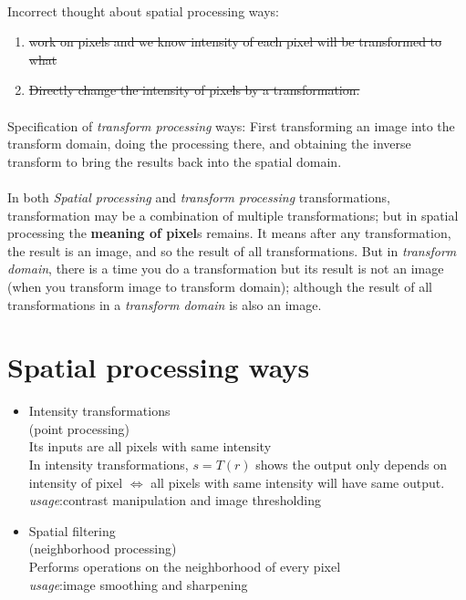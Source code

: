\paragraph*{} Incorrect thought about spatial processing ways:
\begin{enumerate}
    \item \st{work on pixels and we know intensity of each pixel will be
    transformed to what}
    \item \st{Directly change the intensity of pixels by a transformation.}
\end{enumerate}

\paragraph*{}{Specification of \emph{transform processing} ways: \newline
First transforming an image into the transform domain, doing the processing
there, and obtaining the inverse transform to bring the results back into the
spatial domain.}

\paragraph*{} In both \emph{Spatial processing} and \emph{transform processing}
transformations, transformation may be a combination of multiple
transformations; but in spatial processing the \textbf{meaning of pixel}s
remains. It means after any transformation, the result is an image, and so the
result of all transformations. But in \emph{transform domain}, there is a time
you do a transformation but its result is not an image (when you transform
image to transform domain); although the result of all transformations
in a \emph{transform domain} is also an image.

\section{Spatial processing ways}

\begin{itemize}
\item
  Intensity transformations\\
  (point processing)\\
  Its inputs are all pixels with same intensity\\
  In intensity transformations, $s=T(r)$ shows the output only depends on
  intensity of pixel $\Leftrightarrow$  all pixels with same intensity will have
  same output.\\
  \emph{usage}:contrast manipulation and image thresholding
\item
  Spatial ﬁltering\\
  (neighborhood processing)\\
  Performs operations on the neighborhood of every pixel\\
  \emph{usage}:image smoothing and sharpening
\end{itemize}
